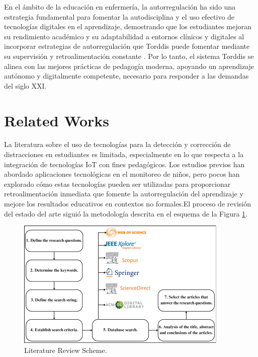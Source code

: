 \documentclass[a4paper,fleqn]{cas-sc}
\begin{document}
	En el ámbito de la educación en enfermería, la autorregulación ha sido una estrategia fundamental para fomentar la autodisciplina y el uso efectivo de tecnologías digitales en el aprendizaje, demostrando que los estudiantes mejoran su rendimiento académico y su adaptabilidad a entornos clínicos y digitales al incorporar estrategias de autorregulación que Torddis puede fomentar mediante su supervisión y retroalimentación constante \citep{Coffman2024Developing}. Por lo tanto, el sistema Torddis se alinea con las mejores prácticas de pedagogía moderna, apoyando un aprendizaje autónomo y digitalmente competente, necesario para responder a las demandas del siglo XXI.
	
	\section{Related Works}
	\label{seccion:Tres}
	La literatura sobre el uso de tecnologías para la detección y corrección de distracciones en estudiantes es limitada, especialmente en lo que respecta a la integración de tecnologías IoT con fines pedagógicos. Los estudios previos han abordado aplicaciones tecnológicas en el monitoreo de niños, pero pocos han explorado cómo estas tecnologías pueden ser utilizadas para proporcionar retroalimentación inmediata que fomente la autorregulación del aprendizaje y mejore los resultados educativos en contextos no formales.El proceso de revisión del estado del arte siguió la metodología descrita en el esquema de la Figura \ref{fig:LRS}.
	
	\begin{figure}[h]
		\includegraphics[width=\textwidth]{figs/Figure_1}
		\caption{Literature Review Scheme.}
		\label{fig:LRS}
	\end{figure}   
	
\end{document}
